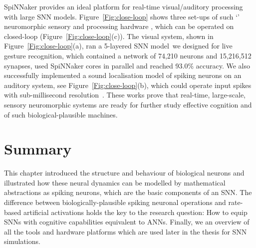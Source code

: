 SpiNNaker provides an ideal platform for real-time visual/auditory processing with large SNN models.
Figure~\ref{Fig:close-loop} shows three set-ups of such `\DIFdelbegin {}\DIFdelend \DIFaddbegin {}\DIFaddend ' neuromorphic sensory and processing hardware \DIFdelbegin {}\DIFdelend \DIFaddbegin {}\DIFaddend , which can be operated on \DIFdelbegin {}\DIFdelend \DIFaddbegin {}\DIFaddend closed-loop \DIFdelbegin {}\DIFdelend \DIFaddbegin {}\DIFaddend (Figure~\ref{Fig:close-loop}(c)).
The visual system, shown in Figure~\ref{Fig:close-loop}(a), ran a 5-layered SNN model~\DIFdelbegin {}\DIFdelend \DIFaddbegin {}\DIFaddend we designed for live gesture recognition, which contained a network of 74,210 neurons and 15,216,512 synapses, used \DIFaddbegin {} SpiNNaker cores in parallel and reached 93.0\% accuracy. 
We also successfully implemented a sound localisation model of spiking neurons on an auditory system, see Figure~\ref{Fig:close-loop}(b), which could operate \DIFaddbegin {}\DIFaddend input spikes with sub-millisecond resolution~\DIFdelbegin {}\DIFdelend \DIFaddbegin {}\DIFaddend .
These works prove that real-time, large-scale, sensory neuromorphic systems are ready for further study \DIFdelbegin {}\DIFdelend \DIFaddbegin {}\DIFaddend effective cognition and \DIFdelbegin {}\DIFdelend \DIFaddbegin {}\DIFaddend of such biological-plausible machines.

\section{Summary}
This chapter introduced the structure and behaviour of biological neurons and illustrated how these neural dynamics can be modelled by mathematical abstractions as spiking neurons, which are the basic components of an SNN.
The difference between biologically-plausible spiking neuronal operations and rate-based artificial activations holds the key to the research question: How to equip SNNs with cognitive capabilities equivalent to ANNs.
Finally, we \DIFdelbegin {}\DIFdelend \DIFaddbegin {}\DIFaddend an overview of all the tools and hardware platforms \DIFdelbegin \DIFdel{, }\DIFdelend which are used later in the thesis \DIFdelbegin \DIFdel{, }\DIFdelend for SNN simulations.
